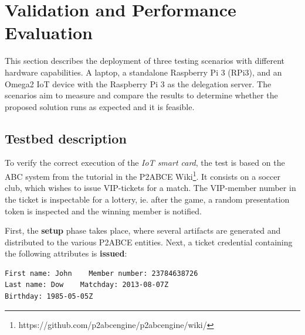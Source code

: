 \section{Validation and Performance Evaluation}\label{ch:validation}


This section describes the deployment of three testing scenarios with different hardware capabilities. A laptop, a standalone Raspberry Pi 3 (RPi3), and an Omega2 IoT device with the Raspberry Pi 3 as the delegation server. The scenarios aim to measure and compare the results to determine whether the proposed solution runs as expected and it is feasible.

\subsection{Testbed description}



To verify the correct execution of the \textit{IoT smart card}, the test is based on the ABC system from the tutorial in the P2ABCE Wiki\footnote{{https://github.com/p2abcengine/p2abcengine/wiki/}}. It consists on a soccer club, which wishes to issue VIP-tickets for a match. The VIP-member number in the ticket is inspectable for a lottery, ie. after the game, a random presentation token is inspected and the winning member is notified.

First, the \textbf{setup} phase takes place, where several artifacts are generated and distributed to the various P2ABCE entities. Next, a ticket credential containing the following attributes is \textbf{issued}:
\begin{Verbatim}[fontsize=\footnotesize]
First name: John	Member number: 23784638726	
Last name: Dow	  Matchday: 2013-08-07Z
Birthday: 1985-05-05Z
\end{Verbatim}


